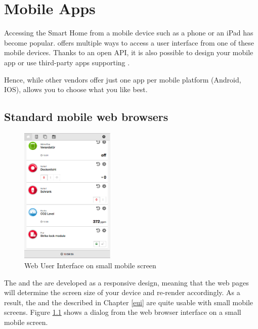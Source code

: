 \chapter{Mobile Apps}
\label{mobileapps}


Accessing the Smart Home from a mobile device such as a phone or an iPad has become popular. 
\zway offers multiple ways to access a user interface from one of these 
mobile devices. Thanks to an open API, it is also possible to design your mobile app or 
use third-party apps supporting \zway.

Hence, while other vendors offer just one app per mobile platform (Android, IOS), \zway 
allows you to choose what you like best.

\section{Standard mobile web browsers}

\begin{figure}
\begin{center}
\includegraphics[width=0.4\textwidth]{pngs/cap5/mobile1.png}
\caption{Web User Interface on small mobile screen}
\label{mobile1}
\end{center}
\end{figure}

The \zwshui and the \zweui are developed as a responsive design, meaning that the web 
pages will determine the screen size of your device and re-render accordingly.
As a result, the \zwshui and the \zweui described 
in Chapter \ref{eui} are quite usable with small mobile screens. Figure \ref{mobile1} 
shows a dialog from the web browser interface on a small mobile screen.

